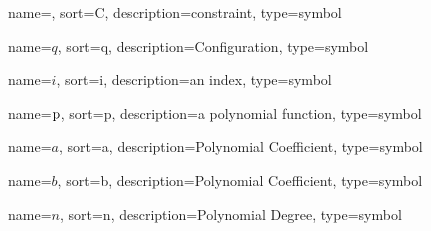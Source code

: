 	{%
		name=\protect{},
		sort=C,
		description=constraint,
		type=symbol
	}
	\newcommand{\constraint}{\gls{sym:constraint}}

	{%
		name=\ensuremath{q},
		sort=q,
		description=Configuration,
		type=symbol
	}
	\newcommand{\configuration}{\gls{sym:configuration}}

	{%
		name=\ensuremath{i},
		sort=i,
		description=an index,
		type=symbol
	}
	\newcommand{\indexi}{\gls{sym:indexi}}

	{%
		name=\ensuremath{\func{p}},
		sort=p,
		description=a polynomial function,
		type=symbol
	}
	\newcommand{\polynomial}{\gls{sym:polynomial}}

	{%
		name=\ensuremath{a},
		sort=a,
		description=Polynomial Coefficient,
		type=symbol
	}
	\newcommand{\coefficient}{\gls{sym:coefficient}}

	{%
		name=\ensuremath{b},
		sort=b,
		description=Polynomial Coefficient,
		type=symbol
	}
	\newcommand{\coefficientb}{\gls{sym:coefficientb}}

	{%
		name=\ensuremath{n},
		sort=n,
		description=Polynomial Degree,
		type=symbol
	}
	\newcommand{\poldeg}{\gls{sym:poldeg}}

